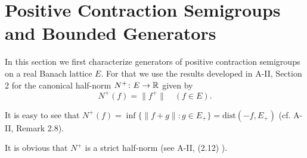 \section{Positive Contraction Semigroups and Bounded Generators}\label{sec:c2-1}
In this section we first characterize generators of positive contraction semigroups on a real Banach lattice $E$.
For that we use the results developed in A-II, Section 2 for the canonical half-norm $N^{+} \colon E \to \mathbb{R}$ given by
\begin{equation}\label{eq:c2-1.1}
N^{+}(f) = \|f^{+}\| \quad (f \in E).
\end{equation}
\begin{remark*}\label{rem:c2-1.1}
It is easy to see that $N^{+}(f) = \inf \{\|f+g\| \colon g \in E_{+}\} = \text{dist}(-f,E_{+})$ (cf. A-II, Remark 2.8). 
\end{remark*}
It is obvious that $N^{+}$ is a strict half-norm (see A-II, (2.12) ). 

